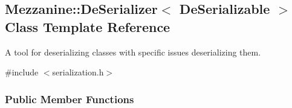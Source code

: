 \hypertarget{classMezzanine_1_1DeSerializer}{
\subsection{Mezzanine::DeSerializer$<$ DeSerializable $>$ Class Template Reference}
\label{classMezzanine_1_1DeSerializer}
}


A tool for deserializing classes with specific issues deserializing them.  




{\ttfamily \#include $<$serialization.h$>$}

\subsubsection*{Public Member Functions}
